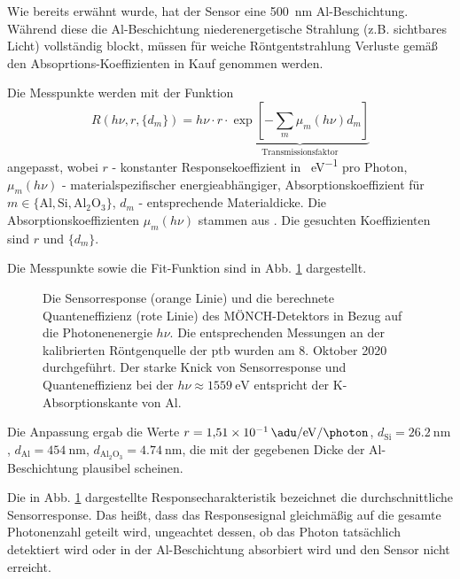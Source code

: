\noindent
Wie bereits erwähnt wurde, hat der Sensor eine \SI{500}{\nano\meter} Al-Beschichtung. Während diese die Al-Beschichtung niederenergetische Strahlung (z.B. sichtbares Licht) vollständig blockt, müssen für weiche Röntgentstrahlung Verluste gemäß den Absoprtions-Koeffizienten in Kauf genommen werden.

\noindent
Die Messpunkte werden mit der Funktion
\begin{equation}
    R(h\nu, r, \{d_m\}) = h\nu\cdot r\cdot\underbrace{\exp\left[-\sum_{m}\mu_m(h\nu)d_m\right]}_{\text{Transmissionsfaktor}}
\label{eq:response_durchschnitt}
\end{equation}
angepasst, wobei $r$ - konstanter Responsekoeffizient in \si{\adu\per\eV} pro Photon, $\mu_m(h\nu)$ - materialspezifischer energieabhängiger, Absorptionskoeffizient für $m \in \{\text{Al}, \text{Si}, \text{Al$_2$O$_3$}\}$,  $d_m$ - entsprechende Materialdicke. Die Absorptionskoeffizienten $\mu_m(h\nu)$ stammen aus \cite{xray-coeffs}. Die gesuchten Koeffizienten sind $r$ und $\{d_m\}$.

\noindent
Die Messpunkte sowie die Fit-Funktion sind in Abb. \ref{fig:response_moench} dargestellt.
\begin{figure}[H]
    \centering
    
    \caption{Die Sensorresponse (orange Linie) und die berechnete Quanteneffizienz (rote Linie) des MÖNCH-Detektors in Bezug auf die Photonenenergie $h\nu$. Die entsprechenden Messungen an der kalibrierten Röntgenquelle der \gls{ptb} wurden am 8. Oktober 2020 durchgeführt. Der starke Knick von Sensorresponse und Quanteneffizienz bei der $h\nu \approx \SI{1559}{\eV}$ entspricht der K-Absorptionskante von Al.}
    \label{fig:response_moench}
\end{figure}
\noindent
Die Anpassung ergab die Werte
$r = \SI[per-mode = symbol]{1.51e-1}{\adu\per\eV\per\photon}$, $d_\text{Si} = \SI{26.2}{\nano\meter}$, $d_\text{Al} = \SI{454}{\nano\meter}$,
$d_\text{Al$_2$O$_3$} = \SI{4.74}{\nano\meter}$, die mit der gegebenen Dicke der Al-Beschichtung plausibel scheinen.

\noindent
Die in Abb. \ref{fig:response_moench} dargestellte Responsecharakteristik bezeichnet die durchschnittliche Sensorresponse. Das heißt, dass das Responsesignal gleichmäßig auf die gesamte Photonenzahl geteilt wird, ungeachtet dessen, ob das Photon tatsächlich detektiert wird oder in der Al-Beschichtung absorbiert wird und den Sensor nicht erreicht.

